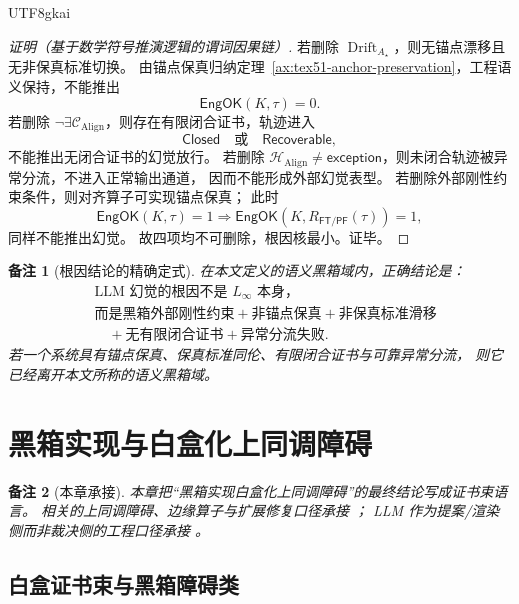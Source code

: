 \documentclass[12pt]{article}
\newtheorem{remark}{备注}[section]
\newcommand{\Linfty}{\ensuremath{L_\infty}}
\newcommand{\EngOK}{\mathsf{EngOK}}
\newcommand{\Closed}{\mathsf{Closed}}
\newcommand{\Recoverable}{\mathsf{Recoverable}}
\newcommand{\Exc}{\mathsf{exception}}
\newcommand{\FTPF}{\mathsf{FT/PF}}
\newcommand{\Align}{\operatorname{Align}}
\newcommand{\Drift}{\operatorname{Drift}}
\begin{document}
\begin{CJK*}{UTF8}{gkai}
\begin{proof}[证明（基于数学符号推演逻辑的谓词因果链）]
若删除 \(\Drift_{A_\star}\)，则无锚点漂移且无非保真标准切换。
由锚点保真归纳定理~\ref{ax:tex51-anchor-preservation}，工程语义保持，不能推出
\[
  \EngOK(K,\tau)=0.
\]
若删除 \(\neg\exists\mathcal C_{\Align}\)，则存在有限闭合证书，轨迹进入
\[
  \Closed
  \quad\text{或}\quad
  \Recoverable,
\]
不能推出无闭合证书的幻觉放行。
若删除 \(\mathcal H_{\Align}\ne\Exc\)，则未闭合轨迹被异常分流，不进入正常输出通道，
因而不能形成外部幻觉表型。
若删除外部刚性约束条件，则对齐算子可实现锚点保真；
此时
\[
  \EngOK(K,\tau)=1\Rightarrow\EngOK(K,R_{\FTPF}(\tau))=1,
\]
同样不能推出幻觉。
故四项均不可删除，根因核最小。证毕。
\end{proof}

\begin{remark}[根因结论的精确定式]
在本文定义的语义黑箱域内，正确结论是：
\[
\boxed{
\begin{aligned}
  &\text{LLM 幻觉的根因不是 }\Linfty\text{ 本身，}\\
  &\text{而是黑箱外部刚性约束}
  +\text{非锚点保真}
  +\text{非保真标准滑移}\\
  &\quad
  +\text{无有限闭合证书}
  +\text{异常分流失败}.
\end{aligned}}
\]
若一个系统具有锚点保真、保真标准同伦、有限闭合证书与可靠异常分流，
则它已经离开本文所称的语义黑箱域。
\end{remark}

\clearpage

\section{黑箱实现与白盒化上同调障碍}
\label{sec:tex51-whitebox-obstruction}

\begin{remark}[本章承接]
本章把“黑箱实现白盒化上同调障碍”的最终结论写成证书束语言。
相关的上同调障碍、边缘算子与扩展修复口径承接
\cite{RepoTex18HomotopyAlgebra,RepoTex50LinftyRepair}；
LLM 作为提案/渲染侧而非裁决侧的工程口径承接
\cite{RepoTex21AuditedWrapper,RepoTex37SemanticRuntime}。
\end{remark}

\subsection{白盒证书束与黑箱障碍类}
\label{subsec:tex51-whitebox-sheaf}


\end{CJK*}
\end{document}
